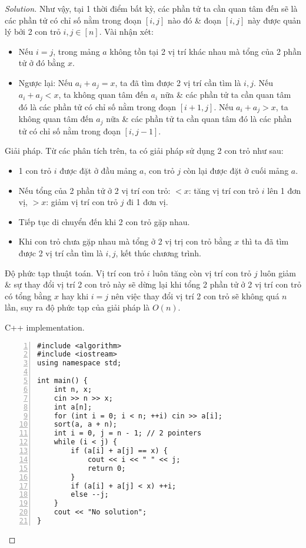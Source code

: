 \documentclass{article}
\begin{document}
\begin{proof}[Solution]
    Như vậy, tại 1 thời điểm bất kỳ, các phần tử ta cần quan tâm đến sẽ là các phần tử có chỉ số nằm trong đoạn $[i,j]$ nào đó \& đoạn $[i,j]$ này được quản lý bởi 2 con trỏ $i,j\in[n]$. Vài nhận xét:
    \begin{itemize}
        \item Nếu $i = j$, trong mảng $a$ không tồn tại 2 vị trí khác nhau mà tổng của 2 phần tử ở đó bằng $x$.
        \item Ngược lại: Nếu $a_i + a_j = x$, ta đã tìm được 2 vị trí cần tìm là $i,j$. Nếu $a_i + a_j < x$, ta không quan tâm đến $a_i$ nữa \& các phần tử ta cần quan tâm đó là các phần tử có chỉ số nằm trong đoạn $[i + 1,j]$. Nếu $a_i + a_j > x$, ta không quan tâm đến $a_j$ nữa \& các phần tử ta cần quan tâm đó là các phần tử có chỉ số nằm trong đoạn $[i,j - 1]$.
    \end{itemize}
    \item {\sf Giải pháp.} Từ các phân tích trên, ta có giải pháp sử dụng 2 con trỏ như sau:
    \begin{itemize}
        \item 1 con trỏ $i$ được đặt ở đầu mảng $a$, con trỏ $j$ còn lại được đặt ở cuối mảng $a$.
        \item Nếu tổng của 2 phần tử ở 2 vị trí con trỏ: $< x$: tăng vị trí con trỏ $i$ lên 1 đơn vị, $> x$: giảm vị trí con trỏ $j$ đi 1 đơn vị.
        \item Tiếp tục di chuyển đến khi 2 con trỏ gặp nhau.
        \item Khi con trỏ chưa gặp nhau mà tổng ở 2 vị trị con trỏ bằng $x$ thì ta đã tìm được 2 vị trí cần tìm là $i,j$, kết thúc chương trình.
    \end{itemize}
    \item {\sf Độ phức tạp thuật toán.} Vị trí con trỏ $i$ luôn tăng còn vị trí con trỏ $j$ luôn giảm \& sự thay đổi vị trí 2 con trỏ này sẽ dừng lại khi tổng 2 phần tử ở 2 vị trí con trỏ có tổng bằng $x$ hay khi $i = j$ nên việc thay đổi vị trí 2 con trỏ sẽ không quá $n$ lần, suy ra độ phức tạp của giải pháp là $O(n)$.
    \item {\sf C++ implementation.}
    \begin{Verbatim}[numbers=left,xleftmargin=5mm]
#include <algorithm>
#include <iostream>
using namespace std;

int main() {
    int n, x;
    cin >> n >> x;
    int a[n];
    for (int i = 0; i < n; ++i) cin >> a[i];
    sort(a, a + n);
    int i = 0, j = n - 1; // 2 pointers
    while (i < j) {
        if (a[i] + a[j] == x) {
            cout << i << " " << j;
            return 0;
        }
        if (a[i] + a[j] < x) ++i;
        else --j;
    }
    cout << "No solution";
}
    \end{Verbatim}
\end{proof}
\end{document}
